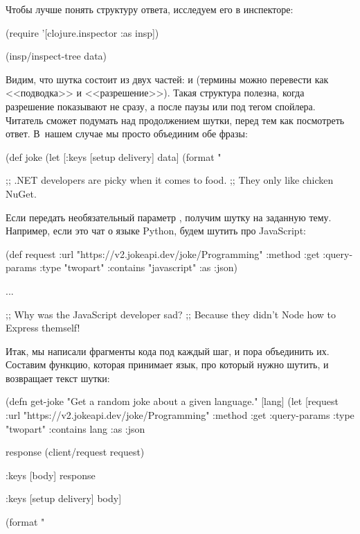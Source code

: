
Чтобы лучше понять структуру ответа, исследуем его в инспекторе:

\begin{english}
  \begin{clojure}
(require '[clojure.inspector :as insp])

(insp/inspect-tree data)
  \end{clojure}
\end{english}

Видим, что шутка состоит из двух частей:  и  (термины можно перевести как <<подводка>> и <<разрешение>>). Такая структура полезна, когда разрешение показывают не сразу, а после паузы или под тегом спойлера. Читатель сможет подумать над продолжением шутки, перед тем как посмотреть ответ. В~нашем случае мы просто объединим обе фразы:

\begin{english}
  \begin{clojure}
(def joke
  (let [{:keys [setup
                delivery]} data]
    (format "%

;; .NET developers are picky when it comes to food.
;; They only like chicken NuGet.
  \end{clojure}
\end{english}


Если передать необязательный параметр , получим шутку на заданную тему. Например, если это чат о языке Python, будем шутить про JavaScript:

\begin{english}
  \begin{clojure}
(def request
  {:url "https://v2.jokeapi.dev/joke/Programming"
   :method :get
   :query-params {:type "twopart" :contains "javascript"}
   :as :json})

...

;; Why was the JavaScript developer sad?
;; Because they didn't Node how to Express themself!
  \end{clojure}
\end{english}

Итак, мы написали фрагменты кода под каждый шаг, и пора объединить их. Составим функцию, которая принимает язык, про который нужно шутить, и возвращает текст шутки:

\begin{english}
  \begin{clojure}
(defn get-joke
  "Get a random joke about a given language."
  [lang]
  (let [request
        {:url "https://v2.jokeapi.dev/joke/Programming"
         :method :get
         :query-params {:type "twopart" :contains lang}
         :as :json}

        response
        (client/request request)

        {:keys [body]}
        response

        {:keys [setup delivery]}
        body]

    (format "%
  \end{clojure}
\end{english}

